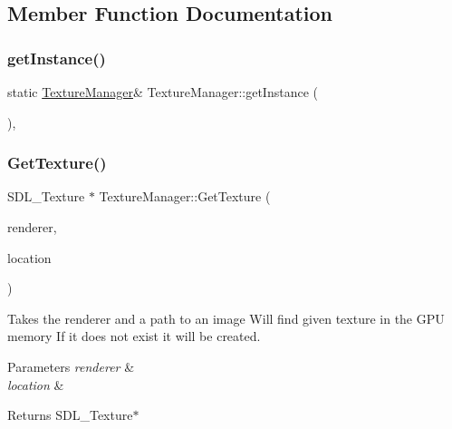 \subsection{Member Function Documentation}
\mbox{\label{class_texture_manager_a0a6bc63e2f6fa7e1d0aee5b24cfa089a}} 
\subsubsection{\texorpdfstring{get\+Instance()}{getInstance()}}
{\footnotesize\ttfamily static \mbox{\hyperlink{class_texture_manager}{Texture\+Manager}}\& Texture\+Manager\+::get\+Instance (\begin{DoxyParamCaption}{ }\end{DoxyParamCaption})\hspace{0.3cm}{\ttfamily [inline]}, {\ttfamily [static]}}

\mbox{\label{class_texture_manager_ac472bb04e6b78569441d5088e5dafa33}} 
\subsubsection{\texorpdfstring{Get\+Texture()}{GetTexture()}}
{\footnotesize\ttfamily S\+D\+L\+\_\+\+Texture $\ast$ Texture\+Manager\+::\+Get\+Texture (\begin{DoxyParamCaption}\item[{S\+D\+L\+\_\+\+Renderer $\ast$}]{renderer,  }\item[{std\+::string}]{location }\end{DoxyParamCaption})}



Takes the renderer and a path to an image Will find given texture in the G\+PU memory If it does not exist it will be created. 


\begin{DoxyParams}{Parameters}
{\em renderer} & \\
\hline
{\em location} & \\
\hline
\end{DoxyParams}
\begin{DoxyReturn}{Returns}
S\+D\+L\+\_\+\+Texture$\ast$
\end{DoxyReturn}


